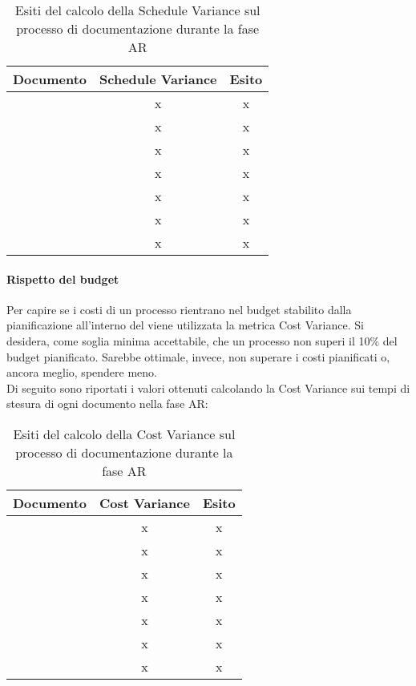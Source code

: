 \documentclass[PianoDiQualifica.tex]{subfiles}
\begin{document}
			\begin{table}[h]
				\centering
				\begin{tabular}{l c c}
					\hline
					\rule[-0.3cm]{0cm}{0.8cm}
					\textbf{Documento} & \textbf{Schedule Variance} & \textbf{Esito} \\
					\hline
					\rule[0cm]{0cm}{0.4cm}
					\PPdocRR & x & x \\
					\rule[0cm]{0cm}{0.4cm}
					\NPdocRR & x & x \\ 
					\rule[0cm]{0cm}{0.4cm}
					\ARdocRR & x & x \\ 
					\rule[0cm]{0cm}{0.4cm}
					\PQdocRR & x & x \\ 
					\rule[0cm]{0cm}{0.4cm}
					\Gldoc & x & x \\ 
					\rule[0cm]{0cm}{0.4cm}
					\SDKdoc & x & x \\ 
					\rule[0cm]{0cm}{0.4cm}
					\SFdocRR & x & x\\ 
					\hline
				\end{tabular}
				\caption{Esiti del calcolo della Schedule Variance sul processo di documentazione durante la fase AR}
			\end{table}
		\paragraph{Rispetto del budget}
		Per capire se i costi di un processo rientrano nel budget stabilito dalla pianificazione all'interno del 				\PPdocRR{} viene utilizzata la metrica Cost Variance. Si desidera, come soglia minima accettabile, che un 				processo non superi il 10\% del budget pianificato. Sarebbe ottimale, invece, non superare i costi pianificati 			o, ancora meglio, spendere meno.\\
		Di seguito sono riportati i valori ottenuti calcolando la Cost Variance sui tempi di stesura di ogni 				documento nella fase AR:\\
\begin{table}[h]
				\centering
				\begin{tabular}{l c c}
					\hline
					\rule[-0.3cm]{0cm}{0.8cm}
					\textbf{Documento} & \textbf{Cost Variance} & \textbf{Esito} \\
					\hline
					\rule[0cm]{0cm}{0.4cm}
					\PPdocRR & x & x \\
					\rule[0cm]{0cm}{0.4cm}
					\NPdocRR & x & x \\ 
					\rule[0cm]{0cm}{0.4cm}
					\ARdocRR & x & x \\ 
					\rule[0cm]{0cm}{0.4cm}
					\PQdocRR & x & x \\ 
					\rule[0cm]{0cm}{0.4cm}
					\Gldoc & x & x \\ 
					\rule[0cm]{0cm}{0.4cm}
					\SDKdoc & x & x \\ 
					\rule[0cm]{0cm}{0.4cm}
					\SFdocRR & x & x\\ 
					\hline
				\end{tabular}
				\caption{Esiti del calcolo della Cost Variance sul processo di documentazione durante la fase AR}
			\end{table}		
		
\end{document}
